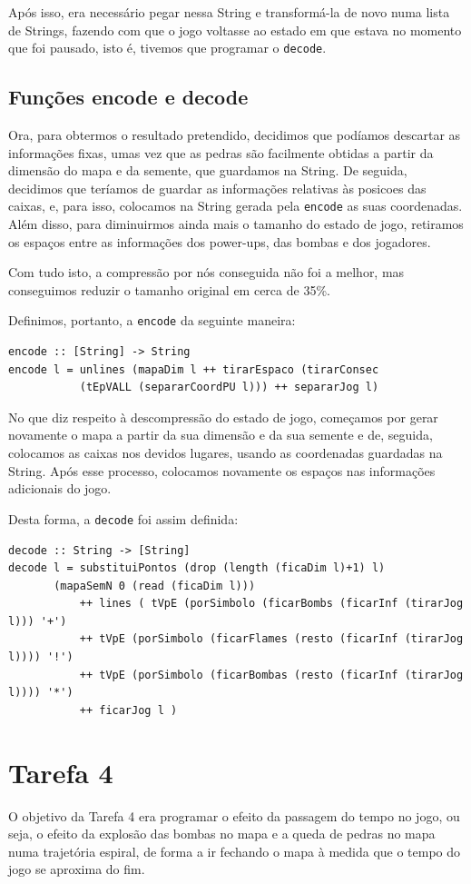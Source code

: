 \documentclass[a4paper]{article}
\begin{document}
Após isso, era necessário pegar nessa String e transformá-la de novo numa lista de Strings, fazendo com que o jogo voltasse ao estado em que estava no momento que foi pausado, isto é, tivemos que programar o \texttt{decode}.

\subsection{Funções encode e decode}
Ora, para obtermos o resultado pretendido, decidimos que podíamos descartar as informações fixas, umas vez que as pedras são facilmente obtidas a partir da dimensão do mapa e da semente, que guardamos na String. De seguida, decidimos que teríamos de guardar as informações relativas às posicoes das caixas, e, para isso, colocamos na String gerada pela \texttt{encode} as suas coordenadas. Além disso, para diminuirmos ainda mais o tamanho do estado de jogo, retiramos os espaços entre as informações dos power-ups, das bombas e dos jogadores.

Com tudo isto, a compressão por nós conseguida não foi a melhor, mas conseguimos reduzir o tamanho original em cerca de 35\%.

Definimos, portanto, a \texttt{encode} da seguinte maneira:
\begin{verbatim}
encode :: [String] -> String
encode l = unlines (mapaDim l ++ tirarEspaco (tirarConsec 
           (tEpVALL (separarCoordPU l))) ++ separarJog l)
\end{verbatim}

No que diz respeito à descompressão do estado de jogo, começamos por gerar novamente o mapa a partir da sua dimensão e da sua semente e de, seguida, colocamos as caixas nos devidos lugares, usando as coordenadas guardadas na String. Após esse processo, colocamos novamente os espaços nas informações adicionais do jogo.

Desta forma, a \texttt{decode} foi assim definida:
\begin{verbatim}
decode :: String -> [String]
decode l = substituiPontos (drop (length (ficaDim l)+1) l) 
       (mapaSemN 0 (read (ficaDim l))) 
           ++ lines ( tVpE (porSimbolo (ficarBombs (ficarInf (tirarJog l))) '+') 
           ++ tVpE (porSimbolo (ficarFlames (resto (ficarInf (tirarJog l)))) '!')
           ++ tVpE (porSimbolo (ficarBombas (resto (ficarInf (tirarJog l)))) '*')
           ++ ficarJog l )
\end{verbatim}

\section{Tarefa 4}
\label{t4}
O objetivo da Tarefa 4 era programar o efeito da passagem do tempo no jogo, ou seja, o efeito da explosão das bombas no mapa e a queda de pedras no mapa numa trajetória espiral, de forma a ir fechando o mapa à medida que o tempo do jogo se aproxima do fim. 
\end{document}
